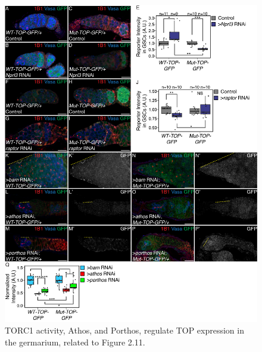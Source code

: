 \documentclass[12pt,oneside]{reedthesis}
\begin{document}
\begin{figure}

{\centering \includegraphics[width=6.5 in,height=8.9375 in]{./figure/Ribosome Biogenesis/Ribosome Biogenesis 6S} 

}

\caption[TORC1 activity, Athos, and Porthos, regulate TOP expression in the germarium, related to Figure 2.11.]{TORC1 activity, Athos, and Porthos, regulate TOP expression in the germarium, related to Figure 2.11.}\label{fig:unnamed-chunk-17}
\end{figure}
\end{document}

